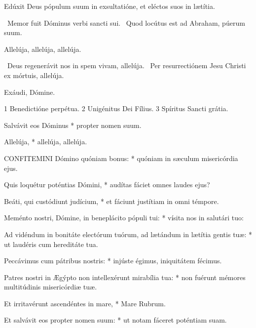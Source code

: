  Edúxit Deus pópulum suum in exsultatióne, et eléctos suos in lætítia.

\sectionornament



\V\ Memor fuit Dóminus verbi sancti sui. \R\ Quod locútus est ad Abraham, púerum suum.



 Allelúja, allelúja, allelúja.

\V\ Deus regenerávit nos in spem vivam, allelúja. \R\ Per resurrectiónem Jesu Christi ex mórtuis, allelúja.

 Exáudi, Dómine.

 1 Benedictióne perpétua. 2 Unigénitus Dei Fílius. 3 Spíritus Sancti grátia.



 Salvávit eos Dóminus * propter nomen suum.


 Allelúja, * allelúja, allelúja.


\lettrine[lines=2]{C}{ONFITEMINI} Dómino quóniam bonus: * quóniam in sæculum misericórdia ejus.

Quis loquétur poténtias Dómini, * audítas fáciet omnes laudes ejus?

Beáti, qui custódiunt judícium, * et fáciunt justítiam in omni témpore.

Meménto nostri, Dómine, in beneplácito pópuli tui: * vísita nos in salutári tuo:

Ad vidéndum in bonitáte electórum tuórum, ad lætándum in lætítia gentis tuæ: * ut laudéris cum hereditáte tua.

Peccávimus cum pátribus nostris: * injúste égimus, iniquitátem fécimus.

Patres nostri in Ægýpto non intellexérunt mirabília tua: * non fuérunt mémores multitúdinis misericórdiæ tuæ.

Et irritavérunt ascendéntes in mare, * Mare Rubrum.

Et salvávit eos propter nomen suum: * ut notam fáceret poténtiam suam.

